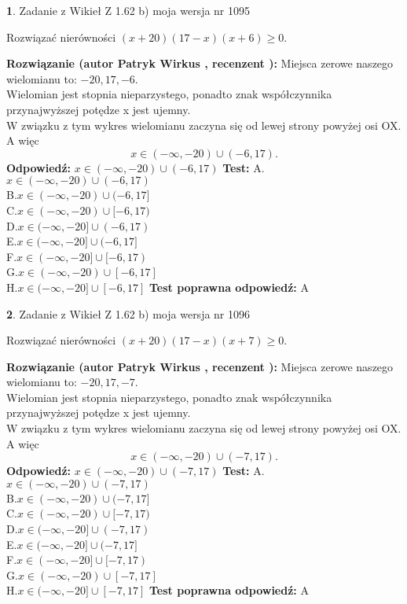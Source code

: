 \documentclass[12pt, a4paper]{article}
\theoremstyle{definition} %
\newtheorem{zad}{}
\newcommand{\zadStart}[1]{\begin{zad}#1\newline}
\newcommand{\zadStop}{\end{zad}}
\newcommand{\rozwStart}[2]{\noindent \textbf{Rozwiązanie (autor #1 , recenzent #2): }\newline}
\newcommand{\rozwStop}{\newline}
\newcommand{\odpStart}{\noindent \textbf{Odpowiedź:}\newline}
\newcommand{\odpStop}{\newline}
\newcommand{\testStart}{\noindent \textbf{Test:}\newline}
\newcommand{\testStop}{\newline}
\newcommand{\kluczStart}{\noindent \textbf{Test poprawna odpowiedź:}\newline}
\newcommand{\kluczStop}{\newline}
\begin{document}
\zadStart{Zadanie z Wikieł Z 1.62 b) moja wersja nr 1095}

Rozwiązać nierówności $(x+20)(17-x)(x+6)\ge0$.
\zadStop
\rozwStart{Patryk Wirkus}{}
Miejsca zerowe naszego wielomianu to: $-20, 17, -6$.\\
Wielomian jest stopnia nieparzystego, ponadto znak współczynnika przy\linebreak najwyższej potędze x jest ujemny.\\ W związku z tym wykres wielomianu zaczyna się od lewej strony powyżej osi OX. A więc $$x \in (-\infty,-20) \cup (-6,17).$$
\rozwStop
\odpStart
$x \in (-\infty,-20) \cup (-6,17)$
\odpStop
\testStart
A.$x \in (-\infty,-20) \cup (-6,17)$\\
B.$x \in (-\infty,-20) \cup (-6,17]$\\
C.$x \in (-\infty,-20) \cup [-6,17)$\\
D.$x \in (-\infty,-20] \cup (-6,17)$\\
E.$x \in (-\infty,-20] \cup (-6,17]$\\
F.$x \in (-\infty,-20] \cup [-6,17)$\\
G.$x \in (-\infty,-20) \cup [-6,17]$\\
H.$x \in (-\infty,-20] \cup [-6,17]$
\testStop
\kluczStart
A
\kluczStop



\zadStart{Zadanie z Wikieł Z 1.62 b) moja wersja nr 1096}

Rozwiązać nierówności $(x+20)(17-x)(x+7)\ge0$.
\zadStop
\rozwStart{Patryk Wirkus}{}
Miejsca zerowe naszego wielomianu to: $-20, 17, -7$.\\
Wielomian jest stopnia nieparzystego, ponadto znak współczynnika przy\linebreak najwyższej potędze x jest ujemny.\\ W związku z tym wykres wielomianu zaczyna się od lewej strony powyżej osi OX. A więc $$x \in (-\infty,-20) \cup (-7,17).$$
\rozwStop
\odpStart
$x \in (-\infty,-20) \cup (-7,17)$
\odpStop
\testStart
A.$x \in (-\infty,-20) \cup (-7,17)$\\
B.$x \in (-\infty,-20) \cup (-7,17]$\\
C.$x \in (-\infty,-20) \cup [-7,17)$\\
D.$x \in (-\infty,-20] \cup (-7,17)$\\
E.$x \in (-\infty,-20] \cup (-7,17]$\\
F.$x \in (-\infty,-20] \cup [-7,17)$\\
G.$x \in (-\infty,-20) \cup [-7,17]$\\
H.$x \in (-\infty,-20] \cup [-7,17]$
\testStop
\kluczStart
A
\kluczStop
\end{document}
